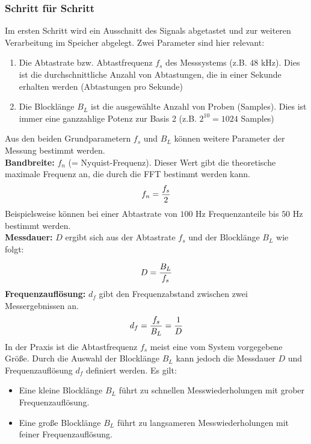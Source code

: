 \subsubsection{Schritt für Schritt}
Im ersten Schritt wird ein Ausschnitt des Signals abgetastet und zur weiteren Verarbeitung im Speicher abgelegt. Zwei Parameter sind hier relevant:
\begin{enumerate}
	\item Die Abtastrate bzw. Abtastfrequenz $f_s$ des Messsystems (z.B. $48$ kHz). Dies ist die durchschnittliche Anzahl von Abtastungen, die in einer Sekunde erhalten werden (Abtastungen pro Sekunde)
	\item Die Blocklänge $B_L$ ist die ausgewählte Anzahl von Proben (Samples). Dies ist immer eine ganzzahlige Potenz zur Basis 2 (z.B. $2^{10}=1024$ Samples)
\end{enumerate}
Aus den beiden Grundparametern $f_s$ und $B_L$ können weitere Parameter der Messung bestimmt werden. \\
\textbf{Bandbreite:}  $f_n$ (= Nyquist-Frequenz). Dieser Wert gibt die theoretische maximale Frequenz an, die durch die FFT bestimmt werden kann.
\begin{align}
	\centering
	f_n = \frac{f_s}{2}
	\label{gl:Nyquist-Frequenz}
\end{align}
Beispielsweise können bei einer Abtastrate von $100$ Hz Frequenzanteile bis $50$ Hz bestimmt werden.\\
\textbf{Messdauer:} $D$ ergibt sich aus der Abtastrate $f_s$ und der Blocklänge $B_L$ wie folgt:

\begin{align}
	\centering
	D = \frac{B_L}{f_s}
	\label{gl:Messdauer}
\end{align}
\textbf{Frequenzauflösung:} $d_f$ gibt den Frequenzabstand zwischen zwei Messergebnissen an.
\begin{align}
	\centering
	d_f = \frac{f_s}{B_L} = \frac{1}{D}
	\label{gl:Frequenzaufloesung}
\end{align}
In der Praxis ist die Abtastfrequenz $f_s$ meist eine vom System vorgegebene Größe. Durch die Auswahl der Blocklänge $B_L$ kann jedoch die Messdauer $D$ und Frequenzauflösung $d_f$ definiert werden. Es gilt:\\
\begin{itemize}
	\item Eine kleine Blocklänge $B_L$ führt zu schnellen Messwiederholungen mit grober Frequenzauflösung.
	\item Eine große Blocklänge $B_L$ führt zu langsameren Messwiederholungen mit feiner Frequenzauflösung.
\end{itemize}
